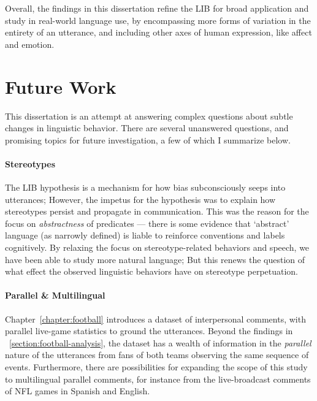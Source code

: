Overall, the findings in this dissertation refine the LIB for broad application and study in real-world language use, by encompassing more forms of variation in the entirety of an utterance, and including other axes of human expression, like affect and emotion. 

\section{Future Work}

This dissertation is an attempt at answering complex questions about subtle changes in linguistic behavior. There are several unanswered questions, and promising topics for future investigation, a few of which I summarize below.

\paragraph{Stereotypes} The LIB hypothesis is a mechanism for how bias subconsciously seeps into utterances; However, the impetus for the hypothesis was to explain how stereotypes persist and propagate in communication. This was the reason for the focus on \emph{abstractness} of predicates --- there is some evidence that `abstract' language (as narrowly defined) is liable to reinforce conventions and labels cognitively. By relaxing the focus on stereotype-related behaviors and speech, we have been able to study more natural language; But this renews the question of what effect the observed linguistic behaviors have on stereotype perpetuation.

\paragraph{Parallel \& Multilingual} Chapter~\ref{chapter:football} introduces a dataset of interpersonal comments, with parallel live-game statistics to ground the utterances. Beyond the findings in \textsection~\ref{section:football-analysis}, the dataset has a wealth of information in the \emph{parallel} nature of the utterances from fans of both teams observing the same sequence of events. Furthermore, there are possibilities for expanding the scope of this study to multilingual parallel comments, for instance from the live-broadcast comments of NFL games in Spanish and English. 

